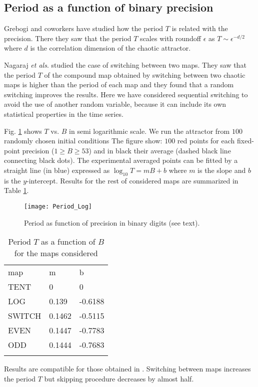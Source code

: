 \subsection{Period as a function of binary precision}

Grebogi and coworkers \cite{Grebogi1988} have studied how the period $T$ is related with the precision.
There they saw that the period $T$ scales with roundoff $\epsilon$ as $T\sim\epsilon^{-d/2}$ where $d$ is the correlation dimension of the chaotic attractor.

Nagaraj \textit{et als}. \cite{Nagaraj2008} studied the case of switching between two maps.
They saw that the period $T$ of the compound map obtained by switching between two chaotic maps is higher than the period of each map and they found that a random switching improves the results.
Here we have considered sequential switching to avoid the use of another random variable, because it can include its own statistical properties in the time series.

Fig. \ref{fig:period} shows  $T$ vs. $B$ in semi logarithmic scale.
We run the attractor from $100$ randomly chosen initial conditions
The figure show: $100$ red points for each fixed-point precision ($1\geq B \geq 53$) and in black their average (dashed black line connecting black dots).
The experimental averaged points can be fitted by a straight line (in blue) expressed as $\log_10 T=m B + b$ where $m$ is the slope and $b$ is the $y$-intercept.
Results for the rest of considered maps are summarized in Table \ref{tabla:periodos}.

\begin{figure}[H]
\centering	
	\texttt{[image: Period\_Log]}
	\caption{Period as function of precision in binary digits (see text).}
	\label{fig:period}
\end{figure}

\begin{table}[H]
\centering	
	\caption{Period $T$ as a function of $B$ for the maps considered}
	\vspace{1em}
	\begin{tabular}{lll}
		\hline\noalign{\smallskip}
		map 	& m 	& b  \\
		\noalign{\smallskip}\hline\noalign{\smallskip}
		TENT	&0 		& 0 \\
		LOG 	&0.139 	& -0.6188 \\
		SWITCH 	&0.1462 & -0.5115 \\
		EVEN 	&0.1447 & -0.7783 \\
		ODD 	&0.1444 & -0.7683 \\
		\noalign{\smallskip}\hline
	\end{tabular}
	\label{tabla:periodos}	
\end{table}

Results are compatible for those obtained in \cite{Nagaraj2008}.
Switching between maps increases the period $T$ but skipping procedure decreases by almost half.